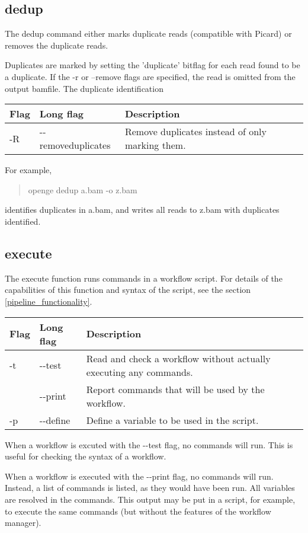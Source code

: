 \documentclass[11pt]{article}
\newcommand {\cmd}[1] {\begin{quote}#1\end{quote}}
\begin{document}
\subsection {dedup}
The dedup command either marks duplicate reads (compatible with Picard) or removes the duplicate reads. 

Duplicates are marked by setting the 'duplicate' bitflag for each read found to be a duplicate. If the -r or --remove flags are specified, the read is omitted from the output bamfile. The duplicate identification 

\begin{center}
\begin{tabular}{llp{3.5in}}
\hline
Flag&Long flag&Description\\ \hline
-R&{-}{-}removeduplicates&Remove duplicates instead of only marking them.\\
\end{tabular}
\end{center}

For example,
\cmd{openge dedup a.bam -o z.bam} 
identifies duplicates in a.bam, and writes all reads to z.bam with duplicates identified.

\subsection {execute}
\label{execute}

The execute function runs commands in a workflow script. For details of the capabilities of this function and syntax of the script, see the section \ref{pipeline_functionality}.

\begin{center}
\begin{tabular}{llp{3.5in}}
\hline
Flag&Long flag&Description\\ \hline
-t&{-}{-}test&Read and check a workflow without actually executing any commands.\\
&{-}{-}print&Report commands that will be used by the workflow.\\
-p&{-}{-}define&Define a variable to be used in the script.\\
\end{tabular}
\end{center}

When a workflow is excuted with the {-}{-}test flag, no commands will run. This is useful for checking the syntax of a workflow.

When a workflow is executed with the {-}{-}print flag, no commands will run. Instead, a list of commands is listed, as they would have been run. All variables are resolved in the commands. This output may be put in a script, for example, to execute the same commands (but without the features of the workflow manager).
\end{document}
